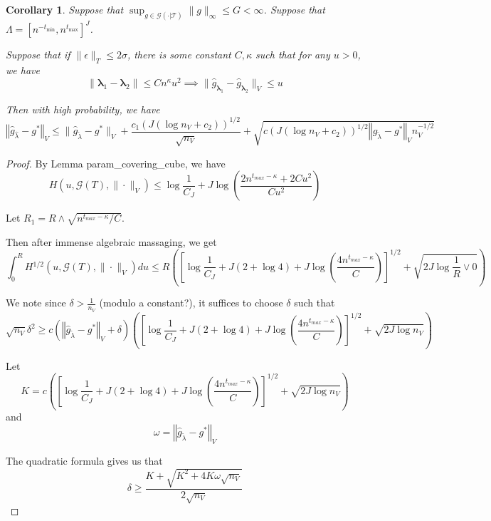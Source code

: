 \documentclass[12pt]{article}
\newtheorem{corollary}{Corollary}
\begin{document}
\begin{corollary}
\label{train_val_corr}
Suppose that $\sup_{g \in \mathcal{G(\cdot | T)}} \| g \|_\infty \le G < \infty$.
Suppose that $\Lambda = [ n^{-t_{\min}}, n^{t_{\max}} ]^J $.

Suppose that if $\| \epsilon \|_T \le 2 \sigma $, there is some constant $C, \kappa$ such that for any $u> 0$, we have
\begin{equation}
\| \boldsymbol \lambda_1 - \boldsymbol \lambda_2 \| \le C n^\kappa u^2 \implies \| \hat{g}_{\boldsymbol \lambda_1} - \hat{g}_{\boldsymbol \lambda_2} \|_V \le u
\end{equation}

Then with high probability, we have
\begin{equation}
\label{error_bound}
\left\Vert \hat{g}_{\hat{\lambda}}-g^{*}\right\Vert _{V}\le\|\hat{g}_{\tilde{\lambda}}-g^{*}\|_{V}+\frac{c_{1}\left(J(\log n_{V}+c_{2})\right)^{1/2}}{\sqrt{n_{V}}}+\sqrt{c\left(J(\log n_{V}+c_{2})\right)^{1/2}\left\Vert \hat{g}_{\tilde{\lambda}}-g^{*}\right\Vert _{V}n_{V}^{-1/2}}
\end{equation}
\end{corollary}

\begin{proof}
By Lemma param\_covering\_cube, we have
\[
H(u,\mathcal{G}(T),\|\cdot\|_{V})\le\log\frac{1}{C_{J}}+J\log\left(\frac{2n^{t_{max}-\kappa}+2Cu^{2}}{Cu^{2}}\right)
\]


Let $R_{1}=R\wedge\sqrt{n^{t_{max}-\kappa}/C}$.

Then after immense algebraic massaging, we get
\begin{equation}
\int_{0}^{R}H{}^{1/2}(u,\mathcal{G}(T),\|\cdot\|_{V})du
\le
R\left(\left[\log\frac{1}{C_{J}}+J(2+\log4)+J\log\left(\frac{4n^{t_{max}-\kappa}}{C}\right)\right]^{1/2}+\sqrt{2J\log\frac{1}{R}\vee0}\right)
\end{equation}

We note since $\delta > \frac{1}{n_{V}}$ (modulo a constant?), it suffices to choose $\delta$ such that
\[
\sqrt{n_{V}}\delta^{2}\ge c\left(\left\Vert \hat{g}_{\tilde{\lambda}}-g^{*}\right\Vert _{V}+\delta\right)\left(\left[\log\frac{1}{C_{J}}+J(2+\log4)+J\log\left(\frac{4n^{t_{max}-\kappa}}{C}\right)\right]^{1/2}+\sqrt{2J\log n_{V}}\right)
\]

Let 
\[
K=c\left(\left[\log\frac{1}{C_{J}}+J(2+\log4)+J\log\left(\frac{4n^{t_{max}-\kappa}}{C}\right)\right]^{1/2}+\sqrt{2J\log n_{V}}\right)
\]
and 
\[
\omega=\left\Vert \hat{g}_{\tilde{\lambda}}-g^{*}\right\Vert _{V}
\]

The quadratic formula gives us that
\[
\delta\ge\frac{K+\sqrt{K^{2}+4K\omega\sqrt{n_{V}}}}{2\sqrt{n_{V}}}
\]
\end{proof}
\end{document}
